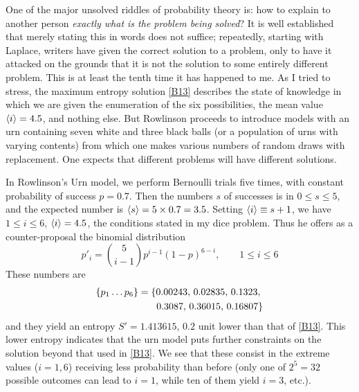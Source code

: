One of the major unsolved riddles of probability theory is: how to explain to another person \emph{exactly what is the problem being solved}?
It is well established that merely stating this in words does not suffice; repeatedly, starting with Laplace, writers have given the correct solution to a problem, only to have it attacked on the grounds that it is not the solution to some entirely different problem.
This is at least the tenth time it has happened to me.
As I tried to stress, the maximum entropy solution \eqref{B13} describes the state of knowledge in which we are given the enumeration of the six possibilities, the mean value $\langle i\rangle = 4.5$, and nothing else.
But Rowlinson proceeds to introduce models with an urn containing seven white and three black balls (or a population of urns with varying contents) from which one makes various numbers of random draws with replacement.
One expects that different problems will have different solutions.

In Rowlinson's Urn model, we perform Bernoulli trials five times, with constant probability of success $p=0.7$.
Then the numbers $s$ of successes is in $0\leq s\leq 5$, and the expected number is $\langle s\rangle = 5\times 0.7 = 3.5$.
Setting $ \langle i\rangle \equiv s+1 $, we have $1\leq i \leq 6$, $\langle i\rangle = 4.5$, the conditions stated in my dice problem.
Thus he offers as a counter-proposal the binomial distribution
\begin{equation}
	\label{B25}
	p'_i = \binom{5}{i-1} p^{i-1} (1-p)^{6-i}, \qquad 1\leq i\leq 6
\end{equation}
These numbers are
\begin{equation}
	\label{B26}
	\begin{split}
		\{p_1\ldots p_6\}
		&= \{0.00243,\, 0.02835,\, 0.1323,\\
		&\hphantom{= \{\ } 0.3087,\, 0.36015,\, 0.16807\}
	\end{split}
\end{equation}
and they yield an entropy $S'=1.413615$, $0.2$ unit lower than that of \eqref{B13}.
This lower entropy indicates that the urn model puts further constraints on the solution beyond that used in \eqref{B13}.
We see that these consist in the extreme values ($i=1,6$) receiving less probability than before (only one of $2^5 = 32$ possible outcomes can lead to $i = 1$, while ten of them yield $i = 3$, etc.).

